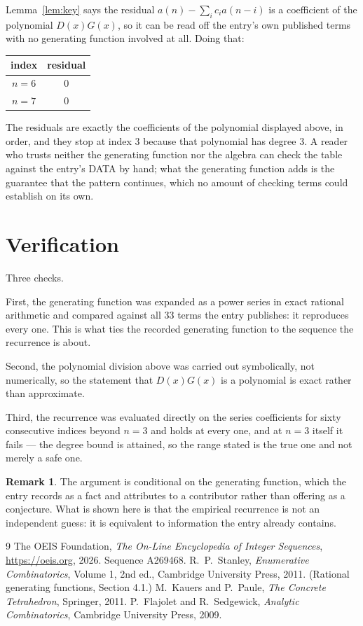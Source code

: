 \documentclass[11pt,a4paper]{article}
\theoremstyle{plain}
\theoremstyle{definition}
\newtheorem{remark}[theorem]{Remark}
\begin{document}
Lemma~\ref{lem:key} says the residual $a(n)-\sum_ic_ia(n-i)$ is a coefficient of the
polynomial $D(x)G(x)$, so it can be read off the entry's own published terms with no
generating function involved at all. Doing that:
\begin{center}
\begin{tabular}{cc}
index & residual \\ \hline
$n=6$ & $0$ \\
$n=7$ & $0$
\end{tabular}
\end{center}
The residuals are exactly the coefficients of the polynomial displayed above, in order, and
they stop at index $3$ because that polynomial has degree $3$. A reader who trusts
neither the generating function nor the algebra can check the table against the entry's DATA
by hand; what the generating function adds is the guarantee that the pattern continues, which
no amount of checking terms could establish on its own.

\section{Verification}

Three checks.

First, the generating function was expanded as a power series in exact rational arithmetic and
compared against all $33$ terms the entry publishes: it reproduces every one. This is
what ties the recorded generating function to the sequence the recurrence is about.

Second, the polynomial division above was carried out symbolically, not numerically, so the
statement that $D(x)G(x)$ is a polynomial is exact rather than approximate.

Third, the recurrence was evaluated directly on the series coefficients for sixty consecutive
indices beyond $n=3$ and holds at every one, and at $n=3$ itself it fails --- the
degree bound is attained, so the range stated is the true one and not merely a safe one.

\begin{remark}
The argument is conditional on the generating function, which the entry records as a fact and
attributes to a contributor rather than offering as a conjecture. What is shown here is that
the empirical recurrence is not an independent guess: it is equivalent to information the
entry already contains.
\end{remark}

\begin{thebibliography}{9}
 The OEIS Foundation, \emph{The On-Line Encyclopedia of Integer
Sequences}, \url{https://oeis.org}, 2026. Sequence A269468.
 R.~P.~Stanley, \emph{Enumerative Combinatorics}, Volume 1, 2nd ed.,
Cambridge University Press, 2011. (Rational generating functions, Section 4.1.)
 M.~Kauers and P.~Paule, \emph{The Concrete Tetrahedron}, Springer, 2011.
 P.~Flajolet and R.~Sedgewick, \emph{Analytic Combinatorics}, Cambridge
University Press, 2009.
\end{thebibliography}
\end{document}
